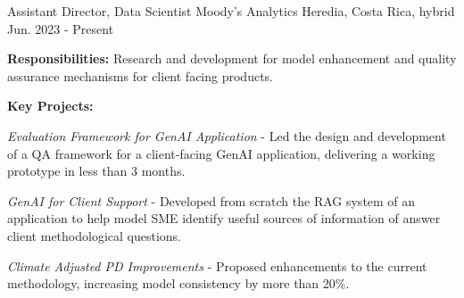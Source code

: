 
\begin{cventries}

  \cventry
    {Assistant Director, Data Scientist} %
    {Moody's Analytics} %
    {Heredia, Costa Rica, hybrid} %
    {Jun. 2023 - Present} %
    {
      \begin{cvitems} %
        \item {\textbf{Responsibilities:} Research and development for model enhancement and quality assurance mechanisms for client facing products.}
        \item {\textbf{Key Projects:}}
        \item {\textit{Evaluation Framework for GenAI Application} - Led the design and development of a QA framework for a client-facing GenAI application, delivering a working prototype in less than 3 months.}
        \item{\textit{GenAI for Client Support} - Developed from scratch the RAG system of an application to help model SME identify useful sources of information of answer client methodological questions.}
        \item {\textit{Climate Adjusted PD Improvements} - Proposed enhancements to the current methodology, increasing model consistency by more than 20\%.}
      \end{cvitems}
    }


\end{cventries}
